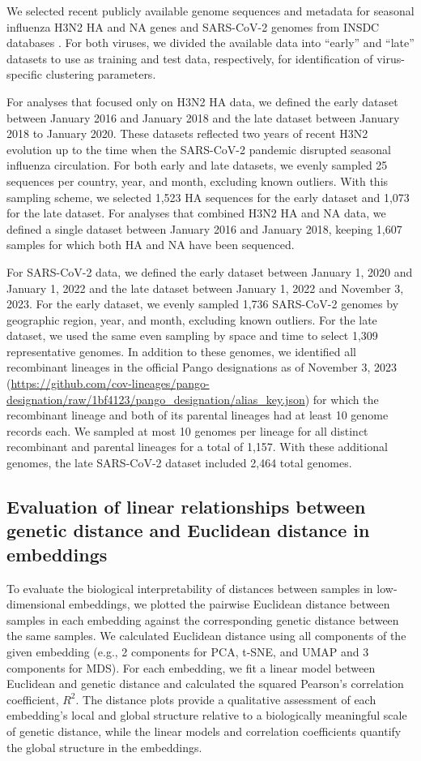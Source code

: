 \documentclass[webpdf,contemporary,large,single]{oup-authoring-template}%
\theoremstyle{thmstyleone}%
\theoremstyle{thmstyletwo}%
\theoremstyle{thmstylethree}%
\begin{document}
We selected recent publicly available genome sequences and metadata for seasonal influenza H3N2 HA and NA genes and SARS-CoV-2 genomes from INSDC databases \citep{Arita2021}.
For both viruses, we divided the available data into ``early'' and ``late'' datasets to use as training and test data, respectively, for identification of virus-specific clustering parameters.

For analyses that focused only on H3N2 HA data, we defined the early dataset between January 2016 and January 2018 and the late dataset between January 2018 to January 2020.
These datasets reflected two years of recent H3N2 evolution up to the time when the SARS-CoV-2 pandemic disrupted seasonal influenza circulation.
For both early and late datasets, we evenly sampled 25 sequences per country, year, and month, excluding known outliers.
With this sampling scheme, we selected 1,523 HA sequences for the early dataset and 1,073 for the late dataset.
For analyses that combined H3N2 HA and NA data, we defined a single dataset between January 2016 and January 2018, keeping 1,607 samples for which both HA and NA have been sequenced.

For SARS-CoV-2 data, we defined the early dataset between January 1, 2020 and January 1, 2022 and the late dataset between January 1, 2022 and November 3, 2023.
For the early dataset, we evenly sampled 1,736 SARS-CoV-2 genomes by geographic region, year, and month, excluding known outliers.
For the late dataset, we used the same even sampling by space and time to select 1,309 representative genomes.
In addition to these genomes, we identified all recombinant lineages in the official Pango designations as of November 3, 2023 (\url{https://github.com/cov-lineages/pango-designation/raw/1bf4123/pango_designation/alias_key.json}) for which the recombinant lineage and both of its parental lineages had at least 10 genome records each.
We sampled at most 10 genomes per lineage for all distinct recombinant and parental lineages for a total of 1,157.
With these additional genomes, the late SARS-CoV-2 dataset included 2,464 total genomes.

\subsection{Evaluation of linear relationships between genetic distance and Euclidean distance in embeddings}

To evaluate the biological interpretability of distances between samples in low-dimensional embeddings, we plotted the pairwise Euclidean distance between samples in each embedding against the corresponding genetic distance between the same samples.
We calculated Euclidean distance using all components of the given embedding (e.g., 2 components for PCA, t-SNE, and UMAP and 3 components for MDS).
For each embedding, we fit a linear model between Euclidean and genetic distance and calculated the squared Pearson's correlation coefficient, $R^{2}$.
The distance plots provide a qualitative assessment of each embedding's local and global structure relative to a biologically meaningful scale of genetic distance, while the linear models and correlation coefficients quantify the global structure in the embeddings.
\end{document}

